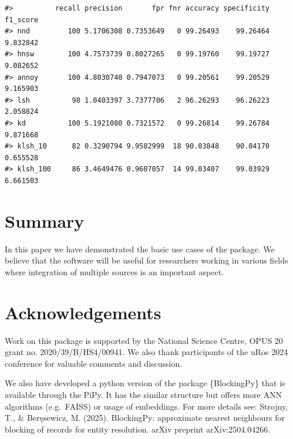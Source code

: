 \begin{verbatim}
#>          recall precision       fpr fnr accuracy specificity f1_score
#> nnd         100 5.1706308 0.7353649   0 99.26493    99.26464 9.832842
#> hnsw        100 4.7573739 0.8027265   0 99.19760    99.19727 9.082652
#> annoy       100 4.8030740 0.7947073   0 99.20561    99.20529 9.165903
#> lsh          98 1.0403397 3.7377706   2 96.26293    96.26223 2.058824
#> kd          100 5.1921080 0.7321572   0 99.26814    99.26784 9.871668
#> klsh_10      82 0.3290794 9.9582999  18 90.03848    90.04170 0.655528
#> klsh_100     86 3.4649476 0.9607057  14 99.03407    99.03929 6.661503
\end{verbatim}

\section{Summary}\label{summary}

In this paper we have demonstrated the basic use cases of the  package. We believe that the software will be useful for researchers working in various fields where integration of multiple sources is an important aspect.

\section{Acknowledgements}\label{acknowledgements}

Work on this package is supported by the National Science Centre, OPUS 20 grant no. 2020/39/B/HS4/00941. We also thank participants of the uRos 2024 conference for valuable comments and discussion.

We also have developed a python version of the package \{BlockingPy\} that is available through the PiPy. It has the similar structure but offers more ANN algorithms (e.g.~FAISS) or usage of embeddings. For more details see: Strojny, T., \& Beręsewicz, M. (2025). BlockingPy: approximate nearest neighbours for blocking of records for entity resolution. arXiv preprint arXiv:2504.04266.



\address{%
Maciej Beręsewicz\\
University of Economics and BusinessStatisical Office in Poznań\\%
Department of Statistics, Poznań, Poland\\ Centre for the Methodology of Population Studies\\
%
\url{https://maciejberesewicz.com}\\%
\textit{ORCiD: \href{https://orcid.org/0000-0002-8281-4301}{0000-0002-8281-4301}}\\%
\href{mailto:maciej.beresewicz@poznan.pl}{\nolinkurl{maciej.beresewicz@poznan.pl}}%
}

\address{%
Adam Struzik\\
Adam Mickiewicz UniversityStatisical Office in Poznań\\%
Department of Mathematics, Poznań, Poland\\ Centre for Urban Statistics\\
%
%
%
\href{mailto:adastr5@st.amu.edu.pl}{\nolinkurl{adastr5@st.amu.edu.pl}}%
}
